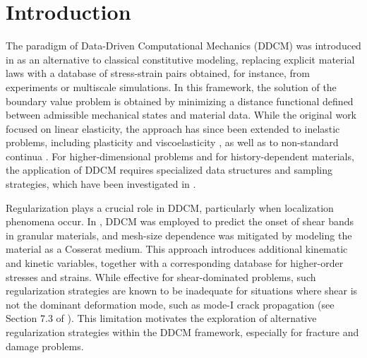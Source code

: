 \documentclass[10pt,review]{cas-sc}
\begin{document}
\maketitle
	
	
	
\section{Introduction}

The paradigm of Data-Driven Computational Mechanics (DDCM) was introduced in \cite{Kirchdoerfer2016} as an alternative to classical constitutive modeling, replacing explicit material laws with a database of stress-strain pairs obtained, for instance, from experiments or multiscale simulations. In this framework, the solution of the boundary value problem is obtained by minimizing a distance functional defined between admissible mechanical states and material data. While the original work focused on linear elasticity, the approach has since been extended to inelastic problems, including plasticity and viscoelasticity \cite{Eggersmann2019}, as well as to non-standard continua \cite{Karapiperis2021a}. For higher-dimensional problems and for history-dependent materials, the application of DDCM requires specialized data structures and sampling strategies, which have been investigated in \cite{Dandin2024,Rocha2025}.

Regularization plays a crucial role in DDCM, particularly when localization phenomena occur. In \cite{Karapiperis2021a}, DDCM was employed to predict the onset of shear bands in granular materials, and mesh-size dependence was mitigated by modeling the material as a Cosserat medium. This approach introduces additional kinematic and kinetic variables, together with a corresponding database for higher-order stresses and strains. While effective for shear-dominated problems, such regularization strategies are known to be inadequate for situations where shear is not the dominant deformation mode, such as mode-I crack propagation (see Section 7.3 of \cite{sluys1992wave}). This limitation motivates the exploration of alternative regularization strategies within the DDCM framework, especially for fracture and damage problems.
\end{document}
